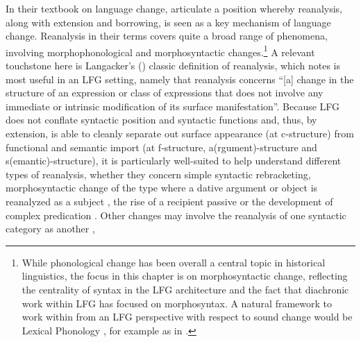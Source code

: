 \documentclass[output=paper,hidelinks]{langscibook}
\begin{document}
In their textbook on language change, \citet{harris1995historical} articulate a position whereby reanalysis, along with extension and borrowing, is seen as a key mechanism of language change.  Reanalysis in their terms covers quite a broad range of phenomena, involving morphophonological and morphosyntactic changes.\footnote{While phonological change has been overall a central topic in historical linguistics, the focus in this chapter is on morphosyntactic change, reflecting the centrality of syntax in the LFG architecture and the fact that diachronic work within LFG has focused on morphosyntax. A natural framework to work within from an LFG perspective with respect to sound change would be Lexical Phonology \citep{kips82a,kips82b,mo86}, for example as in \citet{lahiri2000-change}. 
} A relevant touchstone  here is Langacker's (\citeyear[59]{langacker1977syntactic}) classic definition of reanalysis, which \citet[11]{vincent2001lfg} notes is most useful in an LFG setting, namely that reanalysis concerns ``[a] change in
the structure of an expression or class of expressions that does not involve any immediate or intrinsic modification of its surface manifestation''. 
Because LFG does not conflate syntactic position and syntactic functions and, thus, by extension, is able to cleanly separate out surface appearance (at c-structure) from functional and semantic import (at f-structure, a(rgument)-structure and s(emantic)-structure), it is particularly well-suited to help understand different types of reanalysis, whether they concern simple syntactic rebracketing, morphosyntactic change of the type where a dative argument or object is reanalyzed as a subject \citep{allen1995case,schaetzle18}, the rise of a recipient passive \citep{allen1995case,Allen01} or the development of complex predication \citep{borjars2017lexical}. Other changes may involve the reanalysis of one syntactic category as another \citep{borjars2011preposition}, %
\end{document}
